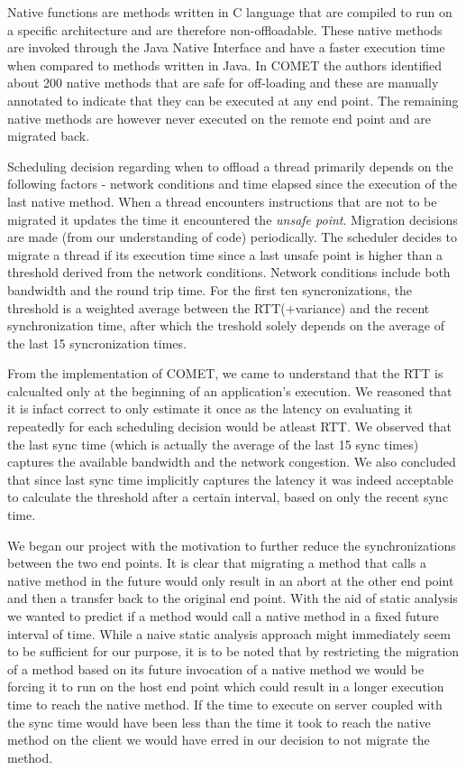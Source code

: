 Native functions are methods written in C language that are compiled to run on a
specific architecture and are therefore non-offloadable. These native methods
are invoked through the Java Native Interface and have a faster execution time when
compared to methods written in Java. In COMET the authors identified about 200
native methods that are safe for off-loading and these are manually annotated to indicate
that they can be executed at any end point. The remaining native methods are
however never executed on the remote end point and are migrated back.

Scheduling decision regarding when to offload a thread primarily depends on the following
factors - network conditions and time elapsed since the execution of the last
native method. When a thread encounters instructions that are not to be migrated it
updates the time it encountered the \textit{unsafe point}. Migration decisions are made (from our
understanding of code) periodically. The scheduler decides to migrate a thread if
its execution time since a last unsafe point is higher than a threshold
derived from the network conditions. Network conditions include both bandwidth and the
round trip time. For the first ten syncronizations, the threshold is a weighted
average between the RTT(+variance) and the recent synchronization time, after which
the treshold solely depends on the average of the last 15 syncronization times.

From the implementation of COMET, we came to understand that the RTT is calcualted
only at the beginning of an application's execution. We reasoned that it is infact
correct to only estimate it once as the latency on evaluating it repeatedly for
each scheduling decision would be atleast RTT. We observed that the last sync
time (which is actually the average of the last 15 sync times) captures the
available bandwidth and the network congestion. We also concluded that since
last sync time implicitly captures the latency it was indeed acceptable to
calculate the threshold after a certain interval, based on only the recent sync time.

We began our project with the motivation to further reduce the synchronizations
between the two end points. It is clear that migrating a method that calls a
native method in the future would only result in an abort at the other end point
and then a transfer back to the original end point. With the aid of static analysis
we wanted to predict if a method would call a native method in a fixed future interval
of time. While a naive static analysis approach might immediately seem to be
sufficient for our purpose, it is to be noted that by restricting the migration of a
method based on its future invocation of a native method we would be forcing it to
run on the host end point which could result in a longer execution time to reach the
native method. If the time to execute on server coupled with the sync time
would have been less than the time it took to reach the native method on the client
we would have erred in our decision to not migrate the method.

